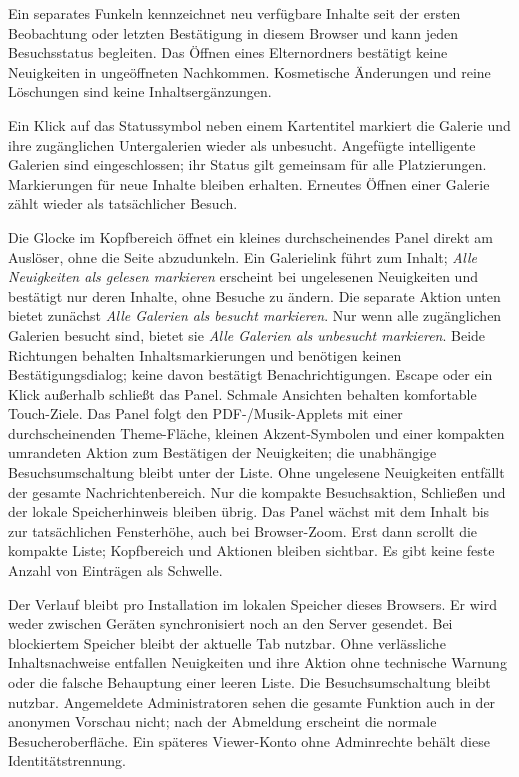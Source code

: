 \documentclass[11pt,a4paper]{article}
\begin{document}
Ein separates Funkeln kennzeichnet neu verfügbare Inhalte seit der ersten
Beobachtung oder letzten Bestätigung in diesem Browser und kann jeden
Besuchsstatus begleiten. Das Öffnen eines Elternordners bestätigt keine
Neuigkeiten in ungeöffneten Nachkommen. Kosmetische Änderungen und reine
Löschungen sind keine Inhaltsergänzungen.

Ein Klick auf das Statussymbol neben einem Kartentitel markiert die Galerie
und ihre zugänglichen Untergalerien wieder als unbesucht. Angefügte intelligente
Galerien sind eingeschlossen; ihr Status gilt gemeinsam für alle Platzierungen.
Markierungen für neue Inhalte bleiben erhalten. Erneutes Öffnen einer Galerie
zählt wieder als tatsächlicher Besuch.

Die Glocke im Kopfbereich öffnet ein kleines durchscheinendes Panel direkt am
Auslöser, ohne die Seite abzudunkeln. Ein Galerielink führt zum Inhalt;
\emph{Alle Neuigkeiten als gelesen markieren} erscheint bei ungelesenen
Neuigkeiten und bestätigt nur deren Inhalte, ohne Besuche zu ändern.
Die separate Aktion unten bietet zunächst
\emph{Alle Galerien als besucht markieren}. Nur wenn alle zugänglichen
Galerien besucht sind, bietet sie \emph{Alle Galerien als unbesucht markieren}.
Beide Richtungen behalten Inhaltsmarkierungen und benötigen keinen
Bestätigungsdialog; keine davon bestätigt Benachrichtigungen.
Escape oder ein Klick außerhalb schließt das Panel. Schmale Ansichten behalten
komfortable Touch-Ziele. Das Panel folgt den PDF-/Musik-Applets mit einer
durchscheinenden Theme-Fläche, kleinen Akzent-Symbolen und einer kompakten
umrandeten Aktion zum Bestätigen der Neuigkeiten; die unabhängige
Besuchsumschaltung bleibt unter der Liste.
Ohne ungelesene Neuigkeiten entfällt der gesamte Nachrichtenbereich. Nur die
kompakte Besuchsaktion, Schließen und der lokale Speicherhinweis bleiben übrig.
Das Panel wächst mit dem Inhalt bis zur tatsächlichen Fensterhöhe, auch bei
Browser-Zoom. Erst dann scrollt die kompakte Liste; Kopfbereich und Aktionen
bleiben sichtbar. Es gibt keine feste Anzahl von Einträgen als Schwelle.

Der Verlauf bleibt pro Installation im lokalen Speicher dieses Browsers. Er
wird weder zwischen Geräten synchronisiert noch an den Server gesendet. Bei
blockiertem Speicher bleibt der aktuelle Tab nutzbar. Ohne verlässliche
Inhaltsnachweise entfallen Neuigkeiten und ihre Aktion ohne technische Warnung
oder die falsche Behauptung einer leeren Liste. Die Besuchsumschaltung bleibt
nutzbar.
Angemeldete Administratoren sehen die gesamte Funktion auch in der anonymen
Vorschau nicht; nach der Abmeldung erscheint die normale Besucheroberfläche.
Ein späteres Viewer-Konto ohne Adminrechte behält diese Identitätstrennung.
\end{document}
